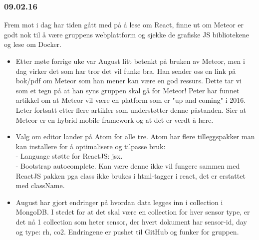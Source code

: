 \documentclass[12pt, oneside]{article}
\begin{document}
\subsubsection{09.02.16}
Frem mot i dag har tiden gått med på å lese om React, finne ut om Meteor er godt nok til å være gruppens webplattform og sjekke de grafiske JS bibliotekene og lese om Docker. 
\begin{itemize}
	\item Etter møte forrige uke var August litt betenkt på bruken av Meteor, men i dag virker det som har tror det vil funke bra. Han sender oss en 			link på bok/pdf om Meteor som han mener kan være en god ressurs. Dette tar vi som et tegn på at han syns gruppen skal gå for Meteor! 			Peter har 	funnet artikkel om at Meteor vil være en platform som er "up and coming" i 2016. Leter fortsatt etter flere artikler som understøtter 		denne påstanden.  Sier at Meteor er en hybrid mobile framework og at det er verdt å lære.
	\item Valg om editor lander på Atom for alle tre. Atom har flere tilleggspakker man kan installere for å optimalisere og tilpasse bruk:\\
		 - Language støtte for ReactJS: jsx.\\
		 - Bootstrap autocomplete. Kan være denne ikke vil fungere sammen med ReactJS pakken pga class ikke brukes i html-tagger i react, det 		er erstattet med className.
	\item August har gjort endringer på hvordan data legges inn i collection i MongoDB. I stedet for at det skal være en collection for hver sensor 			type, er det nå 1 collection som heter sensor, der hvert dokument har  sensor-id, day og type: rh, co2. Endringene er pushet til 			GitHub og funker for gruppen.
\end{itemize}
\end{document}
